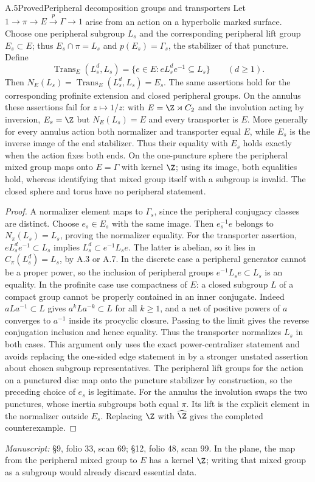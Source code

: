 \begin{claim}{A.5}{Proved}{Peripheral decomposition groups and transporters}
Let $1\to\pi\to E\xrightarrow{p}\Gamma\to1$ arise from an action on a hyperbolic marked surface. Choose one peripheral subgroup $L_s$ and the corresponding peripheral lift group $E_s\subset E$; thus $E_s\cap\pi=L_s$ and $p(E_s)=\Gamma_s$, the stabilizer of that puncture. Define
\[
\operatorname{Trans}_E(L_s^d,L_s)
 =\{e\in E:eL_s^de^{-1}\subseteq L_s\}\qquad(d\ge1).
\]
Then $N_E(L_s)=\operatorname{Trans}_E(L_s^d,L_s)=E_s$. The same assertions hold for the corresponding profinite extension and closed peripheral groups. On the annulus these assertions fail for $z\mapsto1/z$: with $E=\Z\rtimes C_2$ and the involution acting by inversion, $E_s=\Z$ but $N_E(L_s)=E$ and every transporter is $E$. More generally for every annulus action both normalizer and transporter equal $E$, while $E_s$ is the inverse image of the end stabilizer. Thus their equality with $E_s$ holds exactly when the action fixes both ends. On the one-puncture sphere the peripheral mixed group maps onto $E=\Gamma$ with kernel $\Z$; using its image, both equalities hold, whereas identifying that mixed group itself with a subgroup is invalid. The closed sphere and torus have no peripheral statement.
\end{claim}
\begin{proof}
A normalizer element maps to $\Gamma_s$, since the peripheral conjugacy classes are distinct. Choose $e_s\in E_s$ with the same image. Then $e_s^{-1}e$ belongs to $N_\pi(L_s)=L_s$, proving the normalizer equality. For the transporter assertion, $eL_s^de^{-1}\subset L_s$ implies $L_s^d\subset e^{-1}L_se$. The latter is abelian, so it lies in $C_\pi(L_s^d)=L_s$, by A.3 or A.7. In the discrete case a peripheral generator cannot be a proper power, so the inclusion of peripheral groups $e^{-1}L_se\subset L_s$ is an equality. In the profinite case use compactness of $E$: a closed subgroup $L$ of a compact group cannot be properly contained in an inner conjugate. Indeed $aLa^{-1}\subset L$ gives $a^kLa^{-k}\subset L$ for all $k\ge1$, and a net of positive powers of $a$ converges to $a^{-1}$ inside its procyclic closure. Passing to the limit gives the reverse conjugation inclusion and hence equality. Thus the transporter normalizes $L_s$ in both cases. This argument only uses the exact power-centralizer statement and avoids replacing the one-sided edge statement in \cite[Proposition 1.2(i)]{A_Mochizuki2007} by a stronger unstated assertion about chosen subgroup representatives. The peripheral lift groups for the action on a punctured disc map onto the puncture stabilizer by construction, so the preceding choice of $e_s$ is legitimate. For the annulus the involution swaps the two punctures, whose inertia subgroups both equal $\pi$. Its lift is the explicit element in the normalizer outside $E_s$. Replacing $\Z$ with $\widehat\Z$ gives the completed counterexample.
\end{proof}
\noindent\emph{Manuscript:} \S9, folio 33, scan 69; \S12, folio 48, scan 99. In the plane, the map from the peripheral mixed group to $E$ has a kernel $\Z$; writing that mixed group as a subgroup would already discard essential data.

